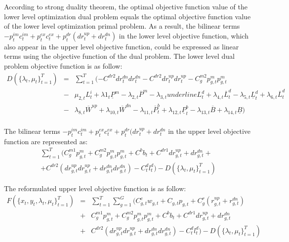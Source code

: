 According to strong duality theorem, the optimal objective function value of the lower level optimization dual problem equals the optimal objective function value of the lower level optimization primal problem.  As a result, the bilinear terms $-p^{im}_{t}c^{im}_{t}+p^{ex}_{t}c^{ex}_{t}+p^{dr}_{t}(dr_{t}^{up}+dr_{t}^{dn})$ in the lower level objective function, which also appear in the upper level objective function, could be expressed as linear terms using the objective function of the dual problem. The lower level dual problem objective function is as follow:\\
\begin{equation*}
\begin{array}{lcl}
D(\{\lambda_t,\mu_t\}^{T}_{t=1}) &=& \sum_{t=1}^{T}(-C^{dr2}dr^{dn}_tdr^{dn}_t - C^{dr2}dr^{up}_tdr^{up}_t - C^{m2}_gp^m_{g,t}p^m_{g,t}\\
&-&\mu_{2,t} L^i_t + \lambda1_t\underline{P}^m - \lambda_{2,t} \overline{P}^m- \lambda_{3,t} underline{L}^d_t + \lambda_{4,t} \overline{L}^d_t - \lambda_{5,t} \underline{L}^d_t+\lambda_{6,t} \overline{L}^d_t \\
&-&\lambda_{8,t} \overline{W}^{up} +\lambda_{10,t} \overline{W}^{dn} -\lambda_{11,t} \overline{P}^b_t +\lambda_{12,t} \underline{P}^b_t-\lambda_{13,t} \overline{B} +\lambda_{14,t} \underline{B})\\
\end{array}
\label{eqn:obj}
\end{equation*}

The bilinear terms $-p^{im}_{t}c^{im}_{t}+p^{ex}_{t}c^{ex}_{t}+p^{dr}_{t}(dr_{t}^{up}+dr_{t}^{dn}$ in the upper level objective function are represented as:
\begin{align*}
\sum_{t=1}^{T}(C^{m1}_g p^m_{g,t} +C^{m2}_g p^m_{g,t}  p^m_{g,t} +C^bb_t + C^{dr1} dr^{up}_{g,t} + dr^{dn}_{g,t}  +\\
+C^{dr2} (dr^{up}_{g,t}dr^{up}_{g,t} + dr^{dn}_{g,t}dr^{dn}_{g,t}  ) - C^d_{t}l^d_{t}) - D(\{\lambda_t,\mu_t\}^{T}_{t=1}) 
\end{align*}

The reformulated upper level objective function is as follow:\\
\begin{equation*}
\begin{array}{lcl}
F\left(\{x_t,y_t, \lambda_t, \mu_t\}^{T}_{t=1}\right) &=& \sum_{t=1}^{T}\sum_{g=1}^{G}(C^c_{g,t} w_{g,t}+C_{g,t} p_{g,t}+C^r_{g}(r_{g,t}^{up}+r_{g,t}^{dn})\\
&+&C^{m1}_g p^m_{g,t} +C^{m2}_g p^m_{g,t}  p^m_{g,t} +C^bb_t + C^{dr1} dr^{up}_{g,t} + dr^{dn}_{g,t} \\
&+&C^{dr2} (dr^{up}_{g,t}dr^{up}_{g,t} + dr^{dn}_{g,t}dr^{dn}_{g,t}  ) - C^d_{t}l^d_{t}) - D(\{\lambda_t,\mu_t\}^{T}_{t=1}) 
\end{array}
\label{eqn:obj}
\end{equation*}

